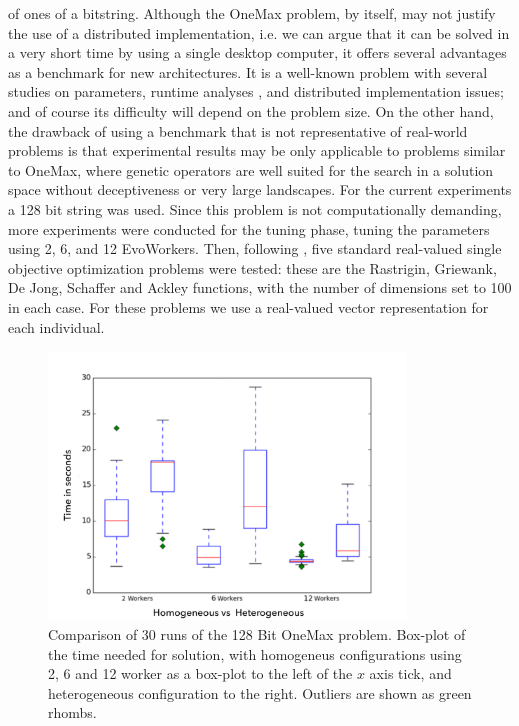 \documentclass[conference]{IEEEtran}
\begin{document}
of ones of a bitstring. Although the OneMax problem, by itself, may not justify the use of a distributed
implementation, i.e. we can argue that it can be solved in a very short time by using a
single desktop computer, it offers several advantages as a
benchmark for new architectures. It is a well-known problem with several
studies on parameters,  runtime analyses \cite{DBLP:journals/corr/MereloGVB15},
and distributed implementation
issues; and of course its difficulty will depend on the problem size. On the other hand, the drawback of using a benchmark that is not representative of
real-world problems is that experimental results may be only applicable to
problems similar to OneMax, where genetic operators are well suited for the
search in a solution space without deceptiveness or very large landscapes.
For the current experiments a 128 bit string was used. Since this
problem is not computationally demanding, more experiments were conducted for the tuning phase,
tuning the parameters using 2, 6, and 12 EvoWorkers. Then, following \cite{fuku1},
five standard real-valued single objective optimization problems were
tested: these are the Rastrigin, Griewank, De Jong, Schaffer  and
Ackley functions,
with the number of dimensions set to 100 in each case. For these problems we use a real-valued vector
representation for each individual.

  \begin{figure}[h!tb]
    \centering
        \includegraphics[width=9.5cm]{img/one_max_comp.png}
    \caption{Comparison of 30 runs of the 128 Bit OneMax problem.
    Box-plot of the time needed for solution, with homogeneus
    configurations using  2, 6 and 12 worker as a box-plot to the left of the $x$ axis
    tick, and heterogeneous configuration to the right. Outliers are
    shown as green rhombs.
    }
    \label{fig:comp-onemax}
  \end{figure}
%
\end{document}
